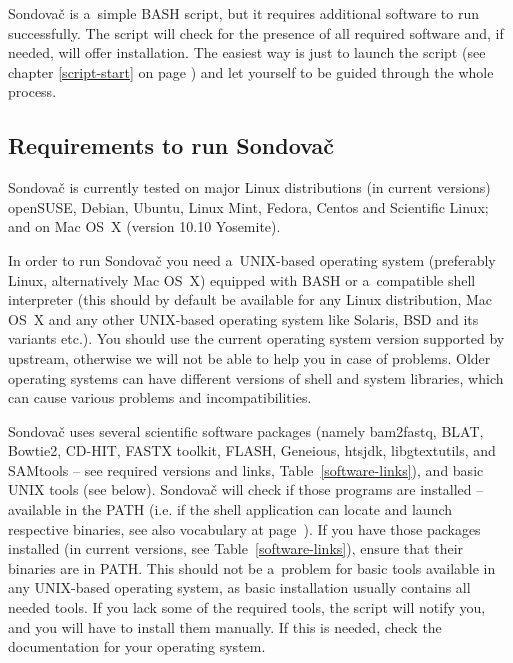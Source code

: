 \documentclass[a4paper, 11pt, twoside]{article}
\begin{document}
Sondovač is a~simple BASH script, but it requires additional software to run successfully. The script will check for the presence of all required software and, if needed, will offer installation. The easiest way is just to launch the script (see chapter \ref{script-start} on page \pageref{script-start}) and let yourself to be guided through the whole process.

\subsection{Requirements to run Sondovač}

Sondovač is currently tested on major Linux distributions (in current versions) openSUSE, Debian, Ubuntu, Linux Mint, Fedora, Centos and Scientific Linux; and on Mac OS~X (version 10.10 Yosemite).

In order to run Sondovač you need a~UNIX-based operating system (preferably Linux, alternatively Mac OS~X) equipped with BASH or a~compatible shell interpreter (this should by default be available for any Linux distribution, Mac OS~X and any other UNIX-based operating system like Solaris, BSD and its variants etc.). You should use the current operating system version supported by upstream, otherwise we will not be able to help you in case of problems. Older operating systems can have different versions of shell and system libraries, which can cause various problems and incompatibilities.

Sondovač uses several scientific software packages (namely bam2fastq, BLAT, Bowtie2, CD-HIT, FASTX toolkit, FLASH, Geneious, htsjdk, libgtextutils, and SAMtools -- see required versions and links, Table~\ref{software-links}), and basic UNIX tools (see below). Sondovač will check if those programs are installed -- available in the PATH (i.e. if the shell application can locate and launch respective binaries, see also vocabulary at page~\pageref{vocabulary}). If you have those packages installed (in current versions, see Table~\ref{software-links}), ensure that their binaries are in PATH. This should not be a~problem for basic tools available in any UNIX-based operating system, as basic installation usually contains all needed tools. If you lack some of the required tools, the script will notify you, and you will have to install them manually. If this is needed, check the documentation for your operating system. %
\end{document}
